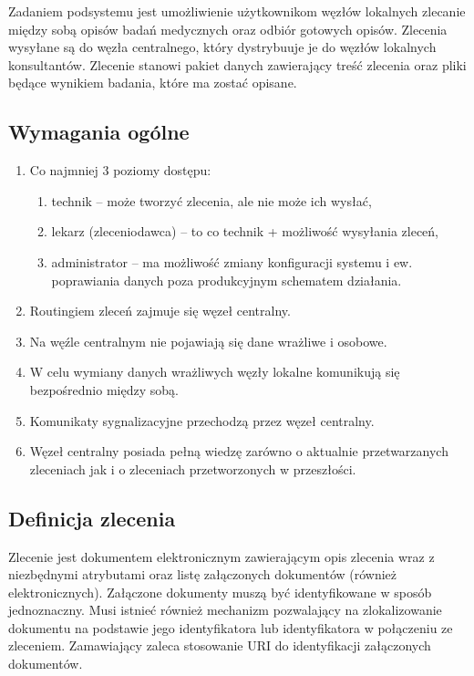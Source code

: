 \documentclass[a4paper]{article}
\begin{document}
Zadaniem podsystemu jest umożliwienie użytkownikom węzłów lokalnych zlecanie między sobą opisów badań medycznych oraz odbiór gotowych opisów. Zlecenia wysyłane są do węzła centralnego, który dystrybuuje je do węzłów lokalnych konsultantów. Zlecenie stanowi pakiet danych zawierający treść zlecenia oraz pliki będące wynikiem badania, które ma zostać opisane. 

\subsection{Wymagania ogólne}
\begin{enumerate}
\item Co najmniej 3 poziomy dostępu:
        \begin{enumerate}
        \item technik -- może tworzyć zlecenia, ale nie może ich wysłać,
        \item lekarz (zleceniodawca) -- to co technik + możliwość wysyłania zleceń,
        \item administrator -- ma możliwość zmiany konfiguracji systemu i ew. poprawiania danych poza produkcyjnym schematem działania.
        \end{enumerate}
\item Routingiem zleceń zajmuje się węzeł centralny.
\item Na węźle centralnym nie pojawiają się dane wrażliwe i osobowe.
\item W celu wymiany danych wrażliwych węzły lokalne komunikują się bezpośrednio między sobą.
\item Komunikaty sygnalizacyjne przechodzą przez węzeł centralny.
\item Węzeł centralny posiada pełną wiedzę zarówno o aktualnie przetwarzanych zleceniach jak i o zleceniach przetworzonych w przeszłości.
\end{enumerate}

\subsection{Definicja zlecenia}

Zlecenie jest dokumentem elektronicznym zawierającym opis zlecenia wraz z niezbędnymi atrybutami oraz listę załączonych dokumentów (również elektronicznych). Załączone dokumenty muszą być identyfikowane w sposób jednoznaczny. Musi istnieć również mechanizm pozwalający na zlokalizowanie dokumentu na podstawie jego identyfikatora lub identyfikatora w połączeniu ze zleceniem. Zamawiający zaleca stosowanie URI do identyfikacji załączonych dokumentów.
\end{document}
